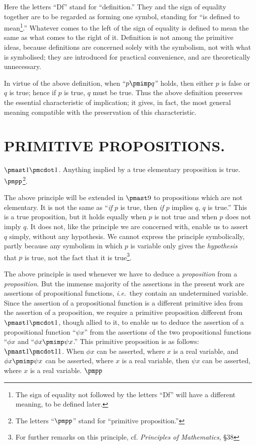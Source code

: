 \documentclass[letterpaper,12pt,openany,leqno]{book}
\newcommand{\pagefirst}[1]{\marginnote[\boxed{\text{#1}}]{\boxed{\text{#1}}}}
\begin{document}
Here the letters ``Df'' stand for ``definition.'' They and the sign of equality together are to be regarded as forming one symbol, standing for ``is defined to mean\footnote{The sign of equality not followed by the letters ``Df'' will have a different meaning, to be defined later.}.'' Whatever comes to the left of the sign of equality is defined to mean the same as what comes to the right of it. Definition is not among the primitive ideas, because definitions are concerned solely with the symbolism, not with what is symbolised; they are introduced for practical convenience, and are theoretically unnecessary.

In virtue of the above definition, when ``$p \pmimp q$'' holds, then either $p$ is false or $q$ is true; hence if $p$ is true, $q$ must be true. Thus the above definition preserves the essential characteristic of implication; it gives, in fact, the most general meaning compatible with the preservation of this characteristic.

\section*{\centering PRIMITIVE PROPOSITIONS.}

$\pmast1\pmcdot1$. Anything implied by a true elementary proposition is true. $\pmpp$\footnote{The letters ``$\pmpp$'' stand for ``primitive proposition.''}.

The above principle will be extended in $\pmast9$ to propositions which are not elementary. It is not the same as ``\textit{if} $p$ is true, then \textit{if} $p$ implies $q$, $q$ is \pagefirst{99} true.'' This is a true proposition, but it holds equally when $p$ is not true and when $p$ does not imply $q$. It does not, like the principle we are concerned with, enable us to assert $q$ simply, without any hypothesis. We cannot express the principle symbolically, partly because any symbolism in which $p$ is variable only gives the \textit{hypothesis} that $p$ is true, not the fact that it is true\footnote{For further remarks on this principle, cf. \textit{Principles of Mathematics}, \S38}.

The above principle is used whenever we have to deduce a \textit{proposition} from a \textit{proposition}. But the immense majority of the assertions in the present work are assertions of propositional functions, \textit{i.e.}\ they contain an undetermined variable. Since the assertion of a propositional function is a different primitive idea from the assertion of a proposition, we require a primitive proposition different from $\pmast1\pmcdot1$, though allied to it, to enable us to deduce the assertion of a propositional function ``$\psi x$'' from the assertions of the two propositional functions ``$\phi x$ and ``$\phi x \pmimp \psi x$.'' This primitive proposition is as follows:
\\ $\pmast1\pmcdot11$. When $\phi x$ can be asserted, where $x$ is a real variable, and $\phi x \pmimp \psi x$ can be asserted, where $x$ is a real variable, then $\psi x$ can be asserted, where $x$ is a real variable. $\pmpp$
\end{document}
